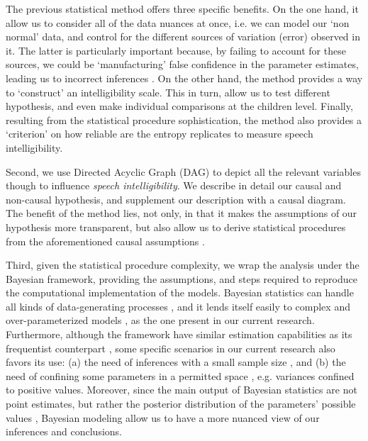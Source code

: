 The previous statistical method offers three specific benefits. On the one hand, it allow us to consider all of the data nuances at once, i.e. we can model our `non normal' data, and control for the different sources of variation (error) observed in it. The latter is particularly important because, by failing to account for these sources, we could be `manufacturing' false confidence in the parameter estimates, leading us to incorrect inferences \cite{McElreath_2020}. On the other hand, the method provides a way to `construct' an intelligibility scale. This in turn, allow us to test different hypothesis, and even make individual comparisons at the children level. Finally, resulting from the statistical procedure sophistication, the method also provides a `criterion' on how reliable are the entropy replicates to measure speech intelligibility.

Second, we use Directed Acyclic Graph (DAG) \cite{Pearl_2009, Cinelli_et_al_2021} to depict all the relevant variables though to influence \textit{speech intelligibility}. We describe in detail our causal and non-causal hypothesis, and supplement our description with a causal diagram. The benefit of the method lies, not only, in that it makes the assumptions of our hypothesis more transparent, but also allow us to derive statistical procedures from the aforementioned causal assumptions \cite{McElreath_2020, Yarkoni_2020, Rohrer_et_al_2021}.

Third, given the statistical procedure complexity, we wrap the analysis under the Bayesian framework, providing the assumptions, and steps required to reproduce the computational implementation of the models. Bayesian statistics can handle all kinds of data-generating processes \cite{Fox_2010}, and it lends itself easily to complex and over-parameterized models \cite{Baker_1998, Kim_1999}, as the one present in our current research. Furthermore, although the framework have similar estimation capabilities as its frequentist counterpart \cite{Baker_1998, Hsieh_2010, Wollack_2002}, some specific scenarios in our current research also favors its use: (a) the need of inferences with a small sample size \cite{Fox_2010, McElreath_2020, Skrondal_et_al_2004a}, and (b) the need of confining some parameters in a permitted space \cite{Martin_et_al_1975}, e.g. variances confined to positive values. Moreover, since the main output of Bayesian statistics are not point estimates, but rather the posterior distribution of the parameters' possible values \cite{McElreath_2020}, Bayesian modeling allow us to have a more nuanced view of our inferences and conclusions.

